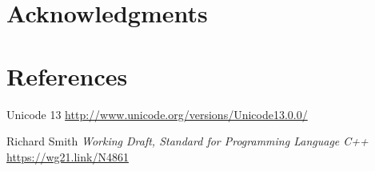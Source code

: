 \documentclass{wg21}
\begin{document}
\section{Acknowledgments}

\section{References}
\renewcommand{\section}[2]{}%



\begin{thebibliography}{9}
    
    
    Unicode 13\newline
    \url{http://www.unicode.org/versions/Unicode13.0.0/}
    
    
    Richard Smith
    \emph{Working Draft, Standard for Programming Language C++}\newline
    \url{https://wg21.link/N4861}
    
\end{thebibliography}
\end{document}
